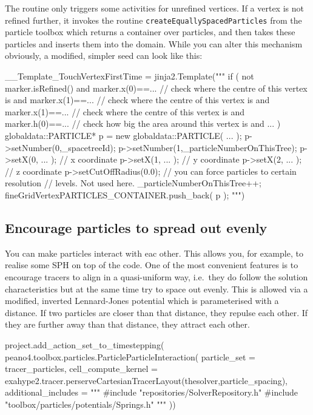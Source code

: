 \noindent
The routine only triggers some activities for unrefined vertices. 
If a vertex is not refined further, it invokes the routine 
\texttt{createEquallySpacedParticles} from the particle toolbox which
returns a container over particles, and then takes these particles and 
inserts them into the domain.
While you can alter this mechanism obviously, a modified, simpler seed can look
like this:

\begin{code}
  __Template_TouchVertexFirstTime = jinja2.Template("""
  if ( 
    not marker.isRefined() 
    and
    marker.x(0)==...      // check where the centre of this vertex is
    and
    marker.x(1)==...      // check where the centre of this vertex is
    and
    marker.x(1)==...      // check where the centre of this vertex is
    and
    marker.h(0)==...      // check how big the area around this vertex is
    and
    ...
  ) {
    globaldata::{{PARTICLE}}* p = new globaldata::{{PARTICLE}}( ... ); 
    p->setNumber(0,_spacetreeId);
    p->setNumber(1,_particleNumberOnThisTree);
    p->setX(0, ... );     // x coordinate
    p->setX(1, ... );     // y coordinate
    p->setX(2, ... );     // z coordinate
    p->setCutOffRadius(0.0); // you can force particles to certain resolution 
                             // levels. Not used here.
    _particleNumberOnThisTree++;
    fineGridVertex{{PARTICLES_CONTAINER}}.push_back( p ); 
  }
""")
\end{code}





\subsection{Encourage particles to spread out evenly}

You can make particles interact with eac other. 
This allows you, for example, to
realise some SPH on top of the code.
One of the most convenient features is to encourage tracers to align in a
quasi-uniform way, i.e.~they do follow the solution characteristics but at the
same time try to space out evenly.
This is allowed via a modified, inverted Lennard-Jones potential
which is parameterised with a distance.
If two particles are closer than that distance, they repulse each other. 
If they are further away than that distance, they attract each other.

\begin{code}
project.add_action_set_to_timestepping( peano4.toolbox.particles.ParticleParticleInteraction(
  particle_set = tracer_particles,
  cell_compute_kernel = exahype2.tracer.perserveCartesianTracerLayout(thesolver,particle_spacing),
  additional_includes = """
#include "repositories/SolverRepository.h"
#include "toolbox/particles/potentials/Springs.h"
"""
))
\end{code}

